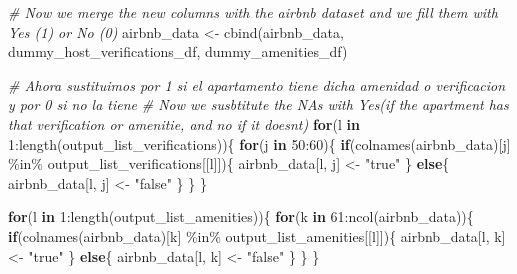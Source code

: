 \documentclass[
]{article}
\newenvironment{Shaded}{\begin{snugshade}}{\end{snugshade}}
\newcommand{\CommentTok}[1]{\textcolor[rgb]{0.56,0.35,0.01}{\textit{#1}}}
\newcommand{\ControlFlowTok}[1]{\textcolor[rgb]{0.13,0.29,0.53}{\textbf{#1}}}
\newcommand{\DecValTok}[1]{\textcolor[rgb]{0.00,0.00,0.81}{#1}}
\newcommand{\FunctionTok}[1]{\textcolor[rgb]{0.00,0.00,0.00}{#1}}
\newcommand{\NormalTok}[1]{#1}
\newcommand{\OtherTok}[1]{\textcolor[rgb]{0.56,0.35,0.01}{#1}}
\newcommand{\SpecialCharTok}[1]{\textcolor[rgb]{0.00,0.00,0.00}{#1}}
\newcommand{\StringTok}[1]{\textcolor[rgb]{0.31,0.60,0.02}{#1}}
\begin{document}
\begin{Shaded}
\begin{Highlighting}[]
\CommentTok{\# Now we merge the new columns with the airbnb dataset and we fill them with Yes (1) or No (0)}
\NormalTok{airbnb\_data }\OtherTok{\textless{}{-}} \FunctionTok{cbind}\NormalTok{(airbnb\_data, dummy\_host\_verifications\_df, dummy\_amenities\_df)}

\CommentTok{\# Ahora sustituimos por 1 si el apartamento tiene dicha amenidad o verificacion y por 0 si no la tiene}
\CommentTok{\# Now we susbtitute the NA\textquotesingle{}s with Yes(if the apartment has that verification or amenitie, and no if it doesn\textquotesingle{}t)}
\ControlFlowTok{for}\NormalTok{(l }\ControlFlowTok{in} \DecValTok{1}\SpecialCharTok{:}\FunctionTok{length}\NormalTok{(output\_list\_verifications))\{}
        \ControlFlowTok{for}\NormalTok{(j }\ControlFlowTok{in} \DecValTok{50}\SpecialCharTok{:}\DecValTok{60}\NormalTok{)\{}
                \ControlFlowTok{if}\NormalTok{(}\FunctionTok{colnames}\NormalTok{(airbnb\_data)[j] }\SpecialCharTok{\%in\%}\NormalTok{ output\_list\_verifications[[l]])\{}
\NormalTok{                        airbnb\_data[l, j] }\OtherTok{\textless{}{-}} \StringTok{"true"}
\NormalTok{                \} }\ControlFlowTok{else}\NormalTok{\{}
\NormalTok{                        airbnb\_data[l, j] }\OtherTok{\textless{}{-}} \StringTok{"false"}
\NormalTok{                \}}
\NormalTok{        \}}
\NormalTok{\}}

\ControlFlowTok{for}\NormalTok{(l }\ControlFlowTok{in} \DecValTok{1}\SpecialCharTok{:}\FunctionTok{length}\NormalTok{(output\_list\_amenities))\{}
        \ControlFlowTok{for}\NormalTok{(k }\ControlFlowTok{in} \DecValTok{61}\SpecialCharTok{:}\FunctionTok{ncol}\NormalTok{(airbnb\_data))\{}
                \ControlFlowTok{if}\NormalTok{(}\FunctionTok{colnames}\NormalTok{(airbnb\_data)[k] }\SpecialCharTok{\%in\%}\NormalTok{ output\_list\_amenities[[l]])\{}
\NormalTok{                        airbnb\_data[l, k] }\OtherTok{\textless{}{-}} \StringTok{"true"}
\NormalTok{                \} }\ControlFlowTok{else}\NormalTok{\{}
\NormalTok{                        airbnb\_data[l, k] }\OtherTok{\textless{}{-}} \StringTok{"false"}
\NormalTok{                \}}
\NormalTok{        \}}
\NormalTok{\}}


\end{Highlighting}
\end{Shaded}
\end{document}
